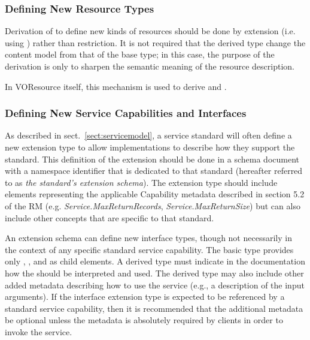\documentclass[11pt,a4paper]{ivoa}
\begin{document}
\subsubsection{Defining New Resource Types}
\label{sect:definingresourcetypes}


Derivation of  to define new kinds of
resources should be done by extension (i.e. using
) rather than restriction.  It is
not required that the derived type change the content model from that
of the  base type; in this case, the purpose
of the derivation is only to sharpen the semantic meaning of the
resource description.

In VOResource itself, this mechanism is used to derive
and .

\subsubsection{Defining New Service Capabilities and Interfaces}
\label{sect:serviceelements}


As described in sect.~\ref{sect:servicemodel}, a service
standard will often define a new  extension
type to allow implementations to describe how they support the
standard.  This definition of the  extension
should be done in a schema document with a namespace identifier that
is dedicated to that standard (hereafter referred to as \emph{the
standard's extension schema}).  The extension type should include
elements representing the applicable Capability metadata described in
section 5.2 of the RM
(e.g. \emph{Service.MaxReturnRecords}, \emph{Service.MaxReturnSize})
but can also include other concepts that are specific to that standard.


An extension schema can define new interface types, though not
necessarily in the context of any specific standard service
capability.  The basic  type provides only
, , and  as child
elements.  A derived  type must indicate in
the documentation how the  should be
interpreted and used.  The derived type may also include other added
metadata describing how to use the service (e.g., a description of the
input arguments).  If the interface extension type is expected to be
referenced by a standard service capability, then it is recommended
that the additional metadata be optional unless the metadata is
absolutely required by clients in order to invoke the service.
\end{document}

